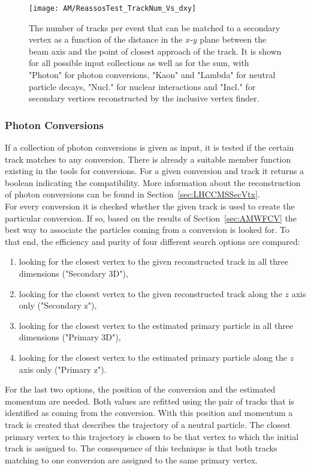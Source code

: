 \begin{figure}[!ht]
    \centering
    \texttt{[image: AM/ReassosTest\_TrackNum\_Vs\_dxy]}
    \caption[Number of tracks that can be matched to a secondary vertex]{The number of tracks per event that can be matched to a secondary vertex as a function of the distance in the $x$-$y$ plane between the beam axis and the point of closest approach of the track. It is shown for all possible input collections as well as for the sum, with "Photon" for photon conversions, "Kaon" and "Lambda" for neutral particle decays, "Nucl." for nuclear interactions and "Incl." for secondary vertices reconstructed by the inclusive vertex finder.\label{plot:AMWFSVfrac}}
\end{figure}

\subsubsection{Photon Conversions \label{sec:AMWFSVpc}}
If a collection of photon conversions is given as input, it is tested if the certain track matches to any conversion. There is already a suitable member function existing in the tools for conversions. For a given conversion and track it returns a boolean indicating the compatibility. More information about the reconstruction of photon conversions can be found in Section~\ref{sec:LHCCMSSecVtx}. \\
For every conversion it is checked whether the given track is used to create the particular conversion. If so, based on the results of Section~\ref{sec:AMWFCV} the best way to associate the particles coming from a conversion is looked for. To that end, the efficiency and purity of four different search options are compared:
\begin{enumerate}
    \item looking for the closest vertex to the given reconstructed track in all three dimensions ("Secondary 3D"),
    \item looking for the closest vertex to the given reconstructed track along the $z$ axis only ("Secondary z"),
    \item looking for the closest vertex to the estimated primary particle in all three dimensions ("Primary 3D"),
    \item looking for the closest vertex to the estimated primary particle along the $z$ axis only ("Primary z").
\end{enumerate}
For the last two options, the position of the conversion and the estimated momentum are needed. Both values are refitted using the pair of tracks that is identified as coming from the conversion. With this position and momentum a track is created that describes the trajectory of a neutral particle. The closest primary vertex to this trajectory is chosen to be that vertex to which the initial track is assigned to. The consequence of this technique is that both tracks matching to one conversion are assigned to the same primary vertex. \\
